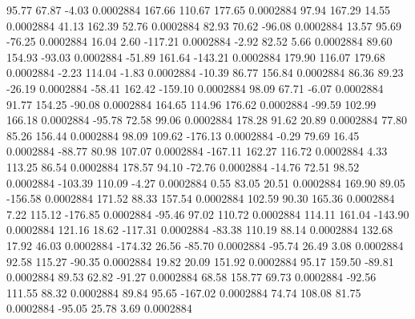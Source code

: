        95.77       67.87       -4.03     0.0002884
      167.66      110.67      177.65     0.0002884
       97.94      167.29       14.55     0.0002884
       41.13      162.39       52.76     0.0002884
       82.93       70.62      -96.08     0.0002884
       13.57       95.69      -76.25     0.0002884
       16.04        2.60     -117.21     0.0002884
       -2.92       82.52        5.66     0.0002884
       89.60      154.93      -93.03     0.0002884
      -51.89      161.64     -143.21     0.0002884
      179.90      116.07      179.68     0.0002884
       -2.23      114.04       -1.83     0.0002884
      -10.39       86.77      156.84     0.0002884
       86.36       89.23      -26.19     0.0002884
      -58.41      162.42     -159.10     0.0002884
       98.09       67.71       -6.07     0.0002884
       91.77      154.25      -90.08     0.0002884
      164.65      114.96      176.62     0.0002884
      -99.59      102.99      166.18     0.0002884
      -95.78       72.58       99.06     0.0002884
      178.28       91.62       20.89     0.0002884
       77.80       85.26      156.44     0.0002884
       98.09      109.62     -176.13     0.0002884
       -0.29       79.69       16.45     0.0002884
      -88.77       80.98      107.07     0.0002884
     -167.11      162.27      116.72     0.0002884
        4.33      113.25       86.54     0.0002884
      178.57       94.10      -72.76     0.0002884
      -14.76       72.51       98.52     0.0002884
     -103.39      110.09       -4.27     0.0002884
        0.55       83.05       20.51     0.0002884
      169.90       89.05     -156.58     0.0002884
      171.52       88.33      157.54     0.0002884
      102.59       90.30      165.36     0.0002884
        7.22      115.12     -176.85     0.0002884
      -95.46       97.02      110.72     0.0002884
      114.11      161.04     -143.90     0.0002884
      121.16       18.62     -117.31     0.0002884
      -83.38      110.19       88.14     0.0002884
      132.68       17.92       46.03     0.0002884
     -174.32       26.56      -85.70     0.0002884
      -95.74       26.49        3.08     0.0002884
       92.58      115.27      -90.35     0.0002884
       19.82       20.09      151.92     0.0002884
       95.17      159.50      -89.81     0.0002884
       89.53       62.82      -91.27     0.0002884
       68.58      158.77       69.73     0.0002884
      -92.56      111.55       88.32     0.0002884
       89.84       95.65     -167.02     0.0002884
       74.74      108.08       81.75     0.0002884
      -95.05       25.78        3.69     0.0002884

